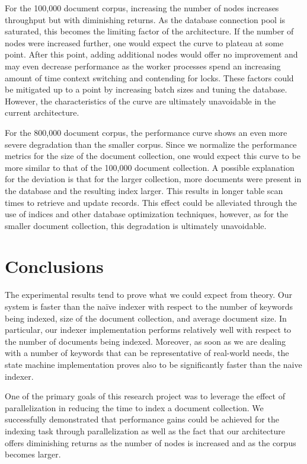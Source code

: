 \documentclass[10pt]{article}
\begin{document}
For the 100,000 document corpus, increasing the number of nodes
increases throughput but with diminishing returns. As the database
connection pool is saturated, this becomes the limiting factor of the
architecture. If the number of nodes were increased further, one would
expect the curve to plateau at some point. After this point, adding
additional nodes would offer no improvement and may even decrease
performance as the worker processes spend an increasing amount of time
context switching and contending for locks. These factors could be
mitigated up to a point by increasing batch sizes and tuning the
database. However, the characteristics of the curve are ultimately
unavoidable in the current architecture. 

For the 800,000 document corpus, the performance curve shows an even
more severe degradation than the smaller corpus. Since we normalize
the performance metrics for the size of the document collection, one
would expect this curve to be more similar to that of the 100,000
document collection. A possible explanation for the deviation is that
for the larger collection, more documents were present in the
database and the resulting index larger. This results in longer table
scan times to retrieve and update records. This effect could be
alleviated through the use of indices and other database optimization
techniques, however, as for the smaller document
collection, this degradation is ultimately unavoidable.


\section{Conclusions}
\label{sec:conclusions}
The experimental results tend to prove what we could expect from
theory. Our system is faster than the na\"{i}ve indexer with respect
to the number of keywords being indexed, size of the document
collection, and average document size. In particular, our indexer
implementation performs relatively well with respect to the number of
documents being indexed. Moreover, as soon as we are dealing with a number of
keywords that can be representative of real-world needs, the state
machine implementation proves also to be significantly faster than the
naive indexer. 

One of the primary goals of this research project was to leverage the
effect of parallelization in reducing the time to index a document
collection. We successfully demonstrated that performance gains could
be achieved for the indexing task through parallelization as well as
the fact that our architecture offers diminishing returns as the
number of nodes is increased and as the corpus becomes larger.
\end{document}
